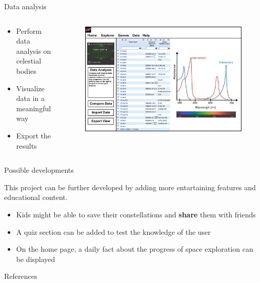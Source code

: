 \documentclass[9pt]{beamer}
\begin{document}
\begin{frame}{Data analysis}

    \begin{columns}[c, onlytextwidth]

        \begin{column}{0.28\textwidth}

            \begin{itemize}
                \item Perform data analysis on celestial bodies
                \item Visualize data in a meaningful way
                \item Export the results
            \end{itemize}

        \end{column}
        \hfill
        \begin{column}{0.7\textwidth}

            \begin{figure}[H]
                \includegraphics[width=\textwidth]{./img/data_analysis.jpg}
            \end{figure}

        \end{column}

    \end{columns}

\end{frame}

\begin{frame}{Possible developments}

    This project can be further developed by adding more entartaining features and educational content.

    \begin{itemize}
        \item Kids might be able to save their constellations and \textbf{share} them with friends
        \item A quiz section can be added to test the knowledge of the user
        \item On the home page, a daily fact about the progress of space exploration can be displayed
    \end{itemize}

\end{frame}

\appendix
\begin{frame}[allowframebreaks]{References}
    \nocite{*}
    
\end{frame}
\end{document}
